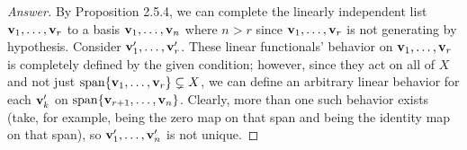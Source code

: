 \documentclass[../psets.tex]{subfiles}
\begin{document}
\begin{enumerate}[label={\textbf{1.\arabic*.}}]
\begin{enumerate}
\begin{proof}[Answer]


            By Proposition 2.5.4, we can complete the linearly independent list $\mathbf{v}_1,\dots,\mathbf{v}_r$ to a basis $\mathbf{v}_1,\dots,\mathbf{v}_n$ where $n>r$ since $\mathbf{v}_1,\dots,\mathbf{v}_r$ is not generating by hypothesis. Consider $\mathbf{v}_1',\dots,\mathbf{v}_r'$. These linear functionals' behavior on $\mathbf{v}_1,\dots,\mathbf{v}_r$ is completely defined by the given condition; however, since they act on all of $X$ and not just $\operatorname{span}\{\mathbf{v}_1,\dots,\mathbf{v}_r\}\subsetneq X$, we can define an arbitrary linear behavior for each $\mathbf{v}_k'$ on $\operatorname{span}\{\mathbf{v}_{r+1},\dots,\mathbf{v}_n\}$. Clearly, more than one such behavior exists (take, for example, being the zero map on that span and being the identity map on that span), so $\mathbf{v}_1',\dots,\mathbf{v}_n'$ is not unique.
        \end{proof}
    \end{enumerate}
\end{enumerate}
\end{document}
